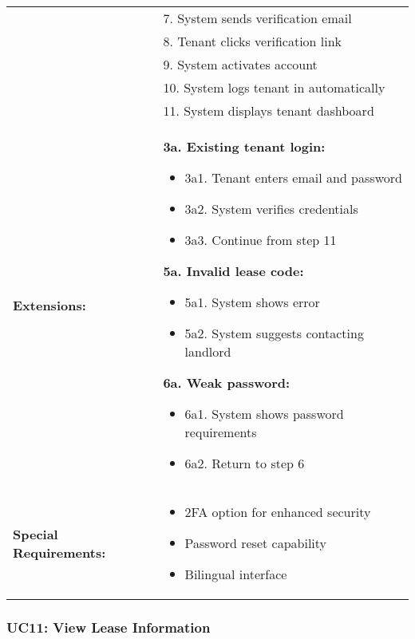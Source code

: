 \documentclass[12pt]{article}
\begin{document}
\begin{tabular}{|p{3cm}|p{11cm}|}
& 7. System sends verification email \\
& 8. Tenant clicks verification link \\
& 9. System activates account \\
& 10. System logs tenant in automatically \\
& 11. System displays tenant dashboard \\
\hline
\textbf{Extensions:} & 
\textbf{3a. Existing tenant login:}
\begin{itemize}
    \item 3a1. Tenant enters email and password
    \item 3a2. System verifies credentials
    \item 3a3. Continue from step 11
\end{itemize}
\textbf{5a. Invalid lease code:}
\begin{itemize}
    \item 5a1. System shows error
    \item 5a2. System suggests contacting landlord
\end{itemize}
\textbf{6a. Weak password:}
\begin{itemize}
    \item 6a1. System shows password requirements
    \item 6a2. Return to step 6
\end{itemize} \\
\hline
\textbf{Special Requirements:} & 
\begin{itemize}
    \item 2FA option for enhanced security
    \item Password reset capability
    \item Bilingual interface
\end{itemize} \\
\hline
\end{tabular}

\subsubsection{UC11: View Lease Information}
\end{document}
